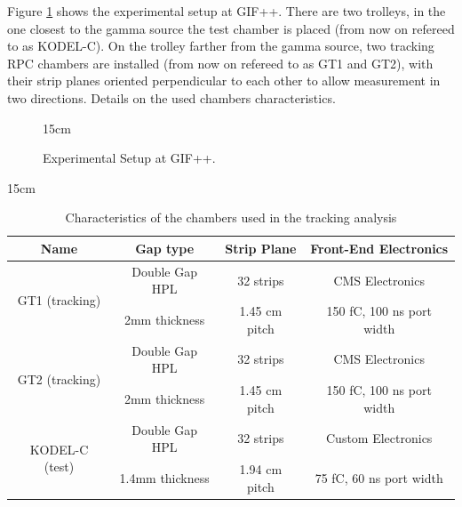 Figure \ref{fig:GIF_setup} shows the experimental setup at GIF++. There are two trolleys, in the one closest to the gamma source the test chamber is placed (from now on refereed to as KODEL-C). On the trolley farther from the gamma source, two tracking RPC chambers are installed (from now on refereed to as GT1 and GT2), with their strip planes oriented perpendicular to each other to allow measurement in two directions. Details on the used chambers characteristics.

\begin{figure}[!htm]{15cm} %
\caption{Experimental Setup at GIF++.}%
\label{fig:GIF_setup}
\end{figure}

\begin{table}[!htbp]{15cm}
\caption{Characteristics of the chambers used in the tracking analysis}\label{tab:RPCchar}
\begin{tabular}{|c|c|c|c|}
    \hline
    Name & Gap type & Strip Plane & Front-End Electronics \\
    \hline
    \multirow{2}{*}{GT1 (tracking)} & Double Gap HPL & 32 strips & CMS Electronics \\ 
     & 2mm thickness & 1.45 cm pitch & 150 fC, 100 ns port width \\
    \hline
    \multirow{2}{*}{GT2 (tracking)} & Double Gap HPL & 32 strips & CMS Electronics \\ 
     & 2mm thickness & 1.45 cm pitch & 150 fC, 100 ns port width \\
    \hline
    \multirow{2}{*}{KODEL-C (test)} & Double Gap HPL & 32 strips & Custom Electronics \\ 
     & 1.4mm thickness & 1.94 cm pitch & 75 fC, 60 ns port width \\
    \hline
\end{tabular}
\end{table}

